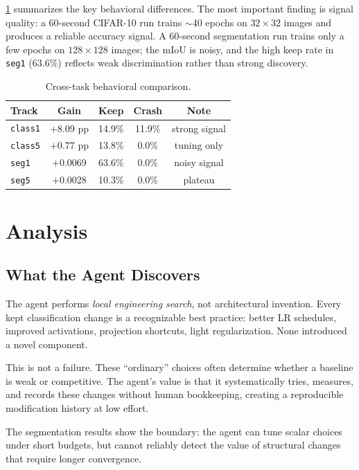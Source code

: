 \documentclass[10pt,twocolumn,letterpaper]{article}
\begin{document}
\cref{tab:cross} summarizes the key behavioral differences.
The most important finding is signal quality: a 60-second CIFAR-10
run trains $\sim$40 epochs on $32\times32$ images and produces a
reliable accuracy signal.
A 60-second segmentation run trains only a few epochs on
$128\times128$ images; the mIoU is noisy, and the high keep rate in
\texttt{seg1} (63.6\%) reflects weak discrimination rather than
strong discovery.

\begin{table}[t]
  \centering
  \caption{Cross-task behavioral comparison.}
  \label{tab:cross}
  \small
  \begin{tabular}{lcccc}
    \toprule
    Track & Gain & Keep & Crash & Note \\
    \midrule
    \texttt{class1} & $+$8.09 pp & 14.9\% & 11.9\% & strong signal \\
    \texttt{class5} & $+$0.77 pp & 13.8\% &  0.0\% & tuning only \\
    \texttt{seg1}   & $+$0.0069  & 63.6\% &  0.0\% & noisy signal \\
    \texttt{seg5}   & $+$0.0028  & 10.3\% &  0.0\% & plateau \\
    \bottomrule
  \end{tabular}
\end{table}

\section{Analysis}

\subsection{What the Agent Discovers}

The agent performs \emph{local engineering search}, not architectural
invention.
Every kept classification change is a recognizable best practice:
better LR schedules, improved activations, projection shortcuts, light
regularization.
None introduced a novel component.

This is not a failure.
These ``ordinary'' choices often determine whether a baseline is weak
or competitive.
The agent's value is that it systematically tries, measures, and
records these changes without human bookkeeping, creating a
reproducible modification history at low effort.

The segmentation results show the boundary: the agent can tune scalar
choices under short budgets, but cannot reliably detect the value of
structural changes that require longer convergence.
\end{document}
